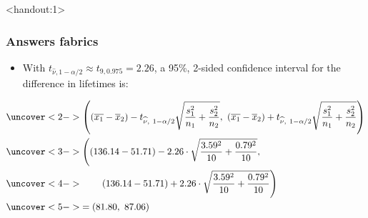 \documentclass[handout]{beamer}\usepackage[]{graphicx}\usepackage[]{color}
\newcommand{\answers}{1}
\providecommand{\ov}[1]{\overline{#1}}
\providecommand{\wh}[1]{\widehat{#1}}
\numberwithin{equation}{section}
\begin{document}
\begin{frame}<handout:\answers>
\frametitle{Answers fabrics} \scriptsize
\begin{itemize}
\item With $t_{\wh{\nu}, 1 - \alpha/2} \approx t_{9, 0.975 }= 2.26$, a 95\%, 2-sided confidence interval for the difference in lifetimes is:
\end{itemize}
\begin{align*}
&\uncover<2->{\left ((\ov{x_1} - \ov{x}_2) - t_{\wh{\nu}, \ 1 - \alpha/2} \sqrt{\frac{s_1^2}{n_1} + \frac{s_2^2}{n_2}} , \ (\ov{x_1} - \ov{x}_2) + t_{\wh{\nu}, \ 1 - \alpha/2} \sqrt{\frac{s^2_1}{n_1} + \frac{s^2_2}{n_2}} \right )} \\
&\uncover<3->{\left ((136.14 - 51.71) - 2.26 \cdot  \sqrt{\frac{3.59^2}{10} + \frac{0.79^2}{10}} , \right .} \\ 
& \uncover<4->{\qquad \left . (136.14 - 51.71) + 2.26 \cdot  \sqrt{\frac{3.59^2}{10} + \frac{0.79^2}{10}} \right )} \\
&\uncover<5->{=  (81.80, \ 87.06) }
\end{align*}
\begin{itemize}
\end{itemize}
\end{frame}
\end{document}
